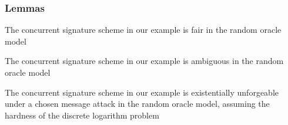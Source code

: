 \begin{frame}
	\frametitle{Lemmas}

	\begin{lemma}[Fairness]
		The concurrent signature scheme in our example is fair in the random oracle model
	\end{lemma}

	\begin{lemma}[Ambiguity]
		The concurrent signature scheme in our example is ambiguous in the random oracle model
	\end{lemma}	

	\begin{lemma}[Unforgeability]
		The concurrent signature scheme in our example is existentially unforgeable under a chosen message attack in the random oracle model, assuming the hardness of the discrete logarithm problem
	\end{lemma}	
\end{frame}
